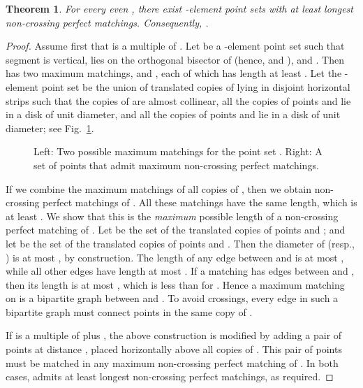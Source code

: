 \documentclass[11pt]{article}
\newtheorem{theorem}{Theorem}
\begin{document}
\begin{theorem} \label{T2}
For every even , there exist -element point sets with
at least  longest non-crossing
perfect matchings. Consequently, .
\end{theorem}
\begin{proof}
Assume first that  is a multiple of .
Let  be a -element point set such that segment
 is vertical,  lies on the orthogonal bisector of  (hence,
 and ),  and
.
Then  has two maximum matchings,  and , each of which
has length at least .
Let the -element point set  be the union of  translated copies of 
lying in disjoint horizontal strips such that the copies of  are
almost collinear, all the copies of points  and  lie in a disk
of unit diameter, and all the copies of points  and  lie in a disk
of unit diameter; see Fig.~\ref{fig:longmatching}.
\begin{figure}[htbp]
\centerline{\epsfxsize=5.5in }
\caption{Left: Two possible maximum matchings for the point set
  . Right: A set of  points that admit 
  maximum non-crossing perfect matchings.}
\label{fig:longmatching}
\end{figure}

If we combine the maximum matchings of all copies of , then we obtain
 non-crossing perfect matchings of . All these matchings
have the same length,
which is at least . We show that this is the
{\em maximum} possible length of a non-crossing perfect matching of .
Let  be the set of the translated copies of points  and ; and
let  be the set of the translated copies of points  and .
Then the diameter of  (resp., ) is at most , by
construction. The length of any edge between  and  is at most
, while all other edges have length at most .
If a matching has  edges between  and , then its length is at most
, which is less than  for
. Hence a maximum matching on  is a bipartite graph between  and
. To avoid crossings, every edge in such a bipartite graph
must connect points in the same copy of .

If  is a multiple of  plus , the above construction is
modified by adding a pair of points at distance , placed
horizontally above all copies of . This pair of points must be
matched in any maximum non-crossing perfect matching of .
In both cases,  admits at least  longest non-crossing
perfect matchings, as required.
\end{proof}
\end{document}
